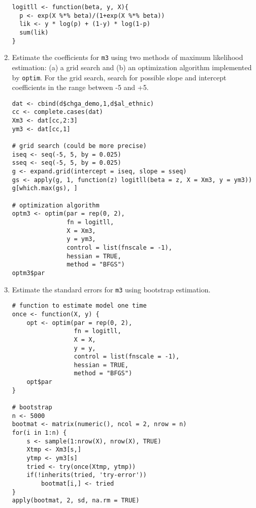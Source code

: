 \documentclass[a4paper,12pt]{article}
\begin{document}
\begin{enumerate}
\begin{solution}
\begin{lstlisting}
logitll <- function(beta, y, X){
  p <- exp(X %*% beta)/(1+exp(X %*% beta))
  lik <- y * log(p) + (1-y) * log(1-p)
  sum(lik)
}
\end{lstlisting}
\end{solution}


\item Estimate the coefficients for \texttt{m3} using two methods of maximum likelihood estimation: (a) a grid search and (b) an optimization algorithm implemented by \texttt{optim}. For the grid search, search for possible slope and intercept coefficients in the range between -5 and +5.

\begin{solution}
\begin{lstlisting}
dat <- cbind(d$chga_demo,1,d$al_ethnic)
cc <- complete.cases(dat)
Xm3 <- dat[cc,2:3]
ym3 <- dat[cc,1]

# grid search (could be more precise)
iseq <- seq(-5, 5, by = 0.025)
sseq <- seq(-5, 5, by = 0.025)
g <- expand.grid(intercept = iseq, slope = sseq)
gs <- apply(g, 1, function(z) logitll(beta = z, X = Xm3, y = ym3))
g[which.max(gs), ]

# optimization algorithm
optm3 <- optim(par = rep(0, 2),
               fn = logitll,
               X = Xm3,
               y = ym3,
               control = list(fnscale = -1),
               hessian = TRUE,
               method = "BFGS")
optm3$par
\end{lstlisting}
\end{solution}

\item Estimate the standard errors for \texttt{m3} using bootstrap estimation. 

\begin{solution}
\begin{lstlisting}
# function to estimate model one time
once <- function(X, y) {
    opt <- optim(par = rep(0, 2),
                 fn = logitll,
                 X = X,
                 y = y,
                 control = list(fnscale = -1),
                 hessian = TRUE,
                 method = "BFGS")
    opt$par
}

# bootstrap
n <- 5000
bootmat <- matrix(numeric(), ncol = 2, nrow = n)
for(i in 1:n) {
    s <- sample(1:nrow(X), nrow(X), TRUE)
    Xtmp <- Xm3[s,]
    ytmp <- ym3[s]
    tried <- try(once(Xtmp, ytmp))
    if(!inherits(tried, 'try-error'))
        bootmat[i,] <- tried
}
apply(bootmat, 2, sd, na.rm = TRUE)


\end{lstlisting}
\end{solution}
\end{enumerate}
\end{document}
